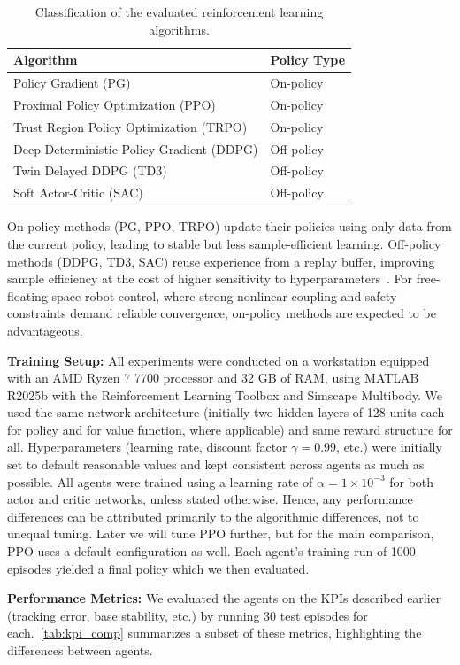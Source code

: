 \documentclass{ieeeaccess}
\begin{document}
\begin{table}[!t]
\centering
\caption{Classification of the evaluated reinforcement learning algorithms.}
\label{tab:on_off_policy}
\begin{tabular}{ll}
\toprule
\textbf{Algorithm} & \textbf{Policy Type} \\
\midrule
Policy Gradient (PG) & On-policy \\
Proximal Policy Optimization (PPO) & On-policy  \\
Trust Region Policy Optimization (TRPO) & On-policy  \\
Deep Deterministic Policy Gradient (DDPG) & Off-policy  \\
Twin Delayed DDPG (TD3) & Off-policy  \\
Soft Actor-Critic (SAC) & Off-policy  \\
\bottomrule
\end{tabular}
\end{table}
On-policy methods (PG, PPO, TRPO) update their policies using only data from the current policy, leading to 
stable but less sample-efficient learning. Off-policy methods (DDPG, TD3, SAC) reuse experience from a replay buffer, 
improving sample efficiency at the cost of higher sensitivity to hyperparameters~\cite{b2,b7}. For free-floating space 
robot control, where strong nonlinear coupling and safety constraints demand reliable convergence, on-policy methods are expected to be advantageous.

\textbf{Training Setup:} All experiments were conducted on a workstation equipped with an AMD Ryzen 7 7700 processor 
and 32 GB of RAM, using MATLAB R2025b with the Reinforcement Learning Toolbox and Simscape Multibody. We used the same
network architecture (initially two hidden layers of 128 units each for policy and for value function,
where applicable) and same reward structure for all. Hyperparameters (learning rate, discount
factor $\gamma = 0.99$, etc.) were initially set to default reasonable values and kept consistent across agents as
much as possible. All agents were trained using a learning rate of $\alpha = 1 \times 10^{-3}$ for both actor and critic networks, unless stated otherwise.
Hence, any performance differences can be
attributed primarily to the algorithmic differences, not to unequal tuning. Later we will tune PPO
further, but for the main comparison, PPO uses a default configuration as well. Each agent’s training
run of 1000 episodes yielded a final policy which we then evaluated.

\textbf{Performance Metrics:} We evaluated the agents on the KPIs described earlier (tracking error, base
stability, etc.) by running 30 test episodes for each.~\autoref{tab:kpi_comp} summarizes a subset of these metrics,
highlighting the differences between agents.
\end{document}
